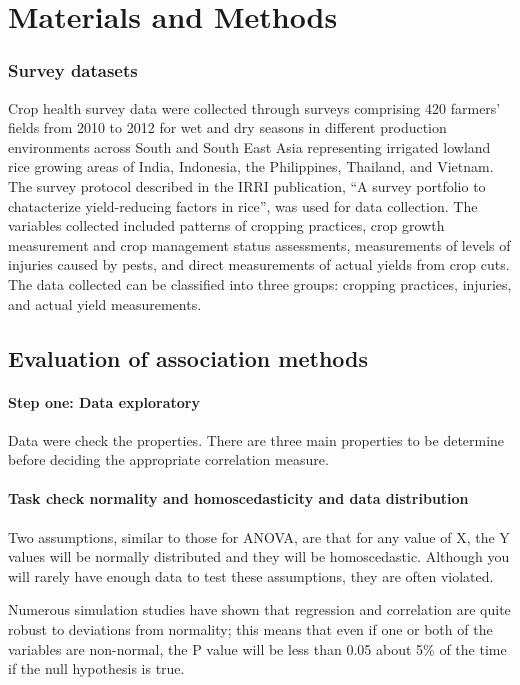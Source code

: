 \documentclass[a4paper]{article}
\begin{document}
\section*{Materials and Methods}

\subsubsection*{Survey datasets}
Crop health survey data were collected through surveys comprising 420 farmers' fields from 2010 to 2012 for wet and dry seasons in different production environments across South and South East Asia representing irrigated lowland rice growing areas of India, Indonesia, the Philippines, Thailand, and Vietnam. The survey protocol described in the IRRI publication, ``A survey  portfolio to chatacterize yield-reducing factors in rice'', \citep{Savarysurvey2009} was used for data collection. The variables collected included patterns of cropping practices, crop growth measurement and crop management status assessments, measurements of levels of injuries caused by pests, and direct measurements of actual yields from crop cuts. The data collected can be classified into three groups: cropping practices, injuries, and actual yield measurements.

\subsection*{Evaluation of association methods}

\paragraph{Step one: Data exploratory}
Data were check the properties. There are three main properties to be determine before deciding the appropriate correlation measure. 

\paragraph{Task check normality and homoscedasticity and data distribution}
Two assumptions, similar to those for ANOVA, are that for any value of X, the Y values will be normally distributed and they will be homoscedastic. Although you will rarely have enough data to test these assumptions, they are often violated.

Numerous simulation studies have shown that regression and correlation are quite robust to deviations from normality; this means that even if one or both of the variables are non-normal, the P value will be less than 0.05 about 5\% of the time if the null hypothesis is true. 
\end{document}
